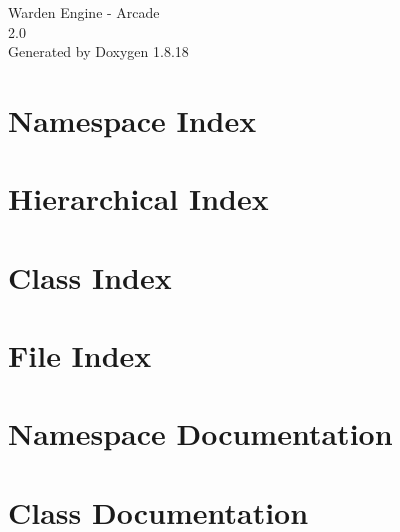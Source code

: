\let\mypdfximage\pdfximage\def\pdfximage{\immediate\mypdfximage}\documentclass[twoside]{book}
\newcommand{\+}{\discretionary{\mbox{\scriptsize$\hookleftarrow$}}{}{}}
\newcommand{\clearemptydoublepage}{%
  \newpage{\pagestyle{empty}\cleardoublepage}%
}
\begin{document}
\hypersetup{pageanchor=false,
             bookmarksnumbered=true,
             pdfencoding=unicode
            }
\begin{titlepage}
\vspace*{7cm}
\begin{center}%
{\Large Warden Engine -\/ Arcade \\[1ex]\large 2.\+0 }\\
\vspace*{1cm}
{\large Generated by Doxygen 1.8.18}\\
\end{center}
\end{titlepage}
\clearemptydoublepage
{}
\tableofcontents
\clearemptydoublepage
{}
\hypersetup{pageanchor=true}

\chapter{Namespace Index}

\chapter{Hierarchical Index}

\chapter{Class Index}

\chapter{File Index}

\chapter{Namespace Documentation}


\chapter{Class Documentation}





































\end{document}
